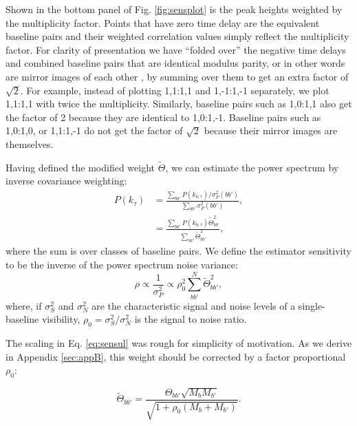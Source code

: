 \documentclass[twocolumn,apj,numberedappendix]{emulateapj}
\renewcommand\[{\begin{equation}}
\renewcommand\]{\end{equation}}
\begin{document}
Shown in the bottom panel of Fig. \ref{fig:sensplot} is the peak heights weighted
by the multiplicity factor. Points that have zero time delay are the equivalent baseline pairs and their weighted correlation values simply reflect the multiplicity factor. For clarity of presentation we have ``folded over'' the negative time delays and combined baseline pairs that are identical modulus parity, 
or in other words are mirror images of each other
, by summing over them to get an extra factor of $\sqrt{2}$. For example, 
instead of plotting 1,1:1,1 and 1,-1:1,-1 separately, we plot 1,1:1,1 with twice the multiplicity. Similarly, baseline pairs such as 
1,0:1,1 also get the factor of 2 because they are identical to 1,0:1,-1. Baseline pairs such as 1,0:1,0, or 1,1:1,-1 do not get
the factor of $\sqrt{2}$ because their mirror images are themselves. 




Having defined the modified weight $\widetilde{\Theta}$, we can estimate the power spectrum by inverse covariance weighting:
\begin{equation}
\begin{aligned}
 P(k_{\tau}) &= \frac{\sum_{bb'}P(k_{b,\tau})/\sigma_P^2(bb')}{\sum_{bb'}\sigma_P^2(bb')}, \\
 &= \frac{\sum_{bb'}P(k_{b,\tau})\widetilde{\Theta}_{bb'}^2}{\sum_{bb'}\widetilde{\Theta}_{bb'}^2},
 \end{aligned}
\end{equation}
where the sum is over classes of baseline pairs. 
We define the estimator sensitivity to be the inverse of the power spectrum noise variance:
\begin{equation}
\rho \propto \frac{1}{\sigma_P^2} \propto \rho_0^2\sum_{bb'}^N\widetilde{\Theta}^2_{bb'},
\end{equation}
where, if $\sigma_S^2$ and $\sigma_N^2$ are the characteristic signal and noise levels of a single-baseline visibility, $\rho_0=\sigma_S^2/\sigma_N^2$ is the signal to noise ratio. 


The scaling in Eq. \ref{eq:sensul} was rough for simplicity of motivation. As we derive in Appendix \ref{sec:appB}, this weight should be corrected by a factor proportional $\rho_0$:

\begin{equation}
\label{eq:tildereal}
\widetilde{\Theta}_{bb'}=\frac{\Theta_{bb'}\sqrt{M_bM_{b'}}}{\sqrt{1 + \rho_0 \left(M_b+M_{b'} \right)}}.
\end{equation}
\end{document}
